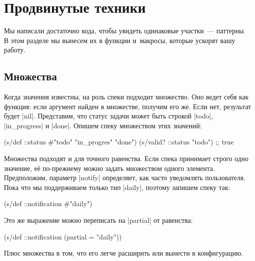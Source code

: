 \section{Продвинутые техники}


Мы написали достаточно кода, чтобы увидеть одинаковые участки~--- паттерны. В
этом разделе мы вынесем их в функции и~макросы, которые ускорят вашу работу.

\subsection{Множества}


Когда значения известны, на роль спеки подходит множество. Оно ведет себя как
функция: если аргумент найден в множестве, получим его же. Если нет, результат
будет \spverb|nil|. Представим, что статус задачи может быть строкой
\spverb|todo|, \spverb|in_progress| и \spverb|done|. Опишем спеку множеством
этих значений:

\begin{english}
  \begin{clojure}
(s/def ::status #{"todo" "in_progres" "done"})
(s/valid? ::status "todo") ;; true
  \end{clojure}
\end{english}

Множества подходят и для точного равенства. Если спека принимает строго одно
значение, е\"{е} по-прежнему можно задать множеством одного
элемента. Предположим, параметр \spverb|notify| определяет, как часто уведомлять
пользователя. Пока что мы поддерживаем только тип \spverb|daily|, поэтому
запишем спеку так:

\begin{english}
  \begin{clojure}
(s/def ::notification #{"daily"})
  \end{clojure}
\end{english}

\noindent
Это же выражение можно переписать на \spverb|partial| от равенства:

\begin{english}
  \begin{clojure}
(s/def ::notification (partial = "daily"))
  \end{clojure}
\end{english}

\noindent
Плюс множества в том, что его легче расширить или вынести в конфигурацию.

